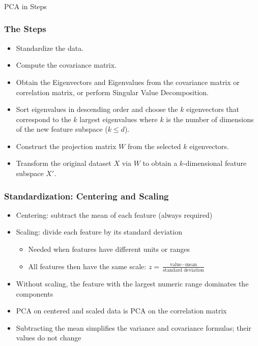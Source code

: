 \begin{frame}[fragile]\frametitle{}
\begin{center}
{\Large PCA in Steps}
\end{center}
\end{frame}

\begin{frame}[fragile] \frametitle{The Steps} 
\begin{itemize}

\item Standardize the data.
\item Compute the covariance matrix.
\item Obtain the Eigenvectors and Eigenvalues from the covariance matrix or correlation matrix, or perform Singular Value Decomposition.
\item Sort eigenvalues in descending order and choose the $k$
 eigenvectors that correspond to the $k$ largest eigenvalues where $k$
 is the number of dimensions of the new feature subspace ($k \leq d$).
\item Construct the projection matrix $W$ from the selected $k$  eigenvectors.
\item Transform the original dataset $X$ via $W$ to obtain a $k$-dimensional feature subspace $X'$.
\end{itemize}
\end{frame}

\begin{frame}[fragile] \frametitle{Standardization: Centering and Scaling}
\begin{itemize}
\item Centering: subtract the mean of each feature (always required)
\item Scaling: divide each feature by its standard deviation
\begin{itemize}
\item Needed when features have different units or ranges
\item All features then have the same scale: $z = \frac{\text{value} - \text{mean}}{\text{standard deviation}}$
\end{itemize}
\item Without scaling, the feature with the largest numeric range dominates the components
\item PCA on centered and scaled data is PCA on the correlation matrix
\item Subtracting the mean simplifies the variance and covariance formulas; their values do not change
\end{itemize}
\end{frame}

